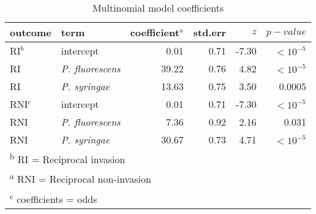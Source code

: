 \begin{table}[!ht]

\caption{\label{tab:}Multinomial model coefficients}
\centering
\begin{tabular}[t]{llrrrr}
\toprule
outcome & term & coefficient$^{a}$ & std.err & $z$ & $p-value$\\
\midrule
RI$^{b}$ & intercept & 0.01 & 0.71 & -7.30 & $<10^{-5}$\\
RI & \textit{P. fluorescens} & 39.22 & 0.76 & 4.82 & $<10^{-5}$\\
RI & \textit{P. syringae} & 13.63 & 0.75 & 3.50 & 0.0005\\
RNI$^{c}$ & intercept & 0.01 & 0.71 & -7.30 & $<10^{-5}$\\
RNI & \textit{P. fluorescens} & 7.36 & 0.92 & 2.16 & 0.031\\
RNI & \textit{P. syringae} & 30.67 & 0.73 & 4.71 & $<10^{-5}$\\
\bottomrule
\multicolumn{6}{l}{\textsuperscript{b} RI = Reciprocal invasion}\\
\multicolumn{6}{l}{\textsuperscript{a} RNI = Reciprocal non-invasion}\\
\multicolumn{6}{l}{\textsuperscript{c} coefficients = odds}\\
\end{tabular}
\end{table}
